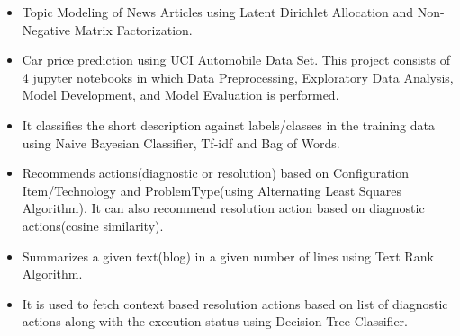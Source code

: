 
\let\orighref\href
\renewcommand{\hrefa}[2]{\orighref{#1}{#2\,\faExternalLink}}

\begin{itemize}
\item Topic Modeling of News Articles using Latent Dirichlet Allocation and Non-Negative Matrix Factorization.
\end{itemize}
\begin{itemize}
\item Car price prediction using \href{https://archive.ics.uci.edu/ml/datasets/Automobile}{UCI Automobile Data Set}. This project consists of 4 jupyter notebooks in which Data Preprocessing, Exploratory Data Analysis, Model Development, and Model Evaluation is performed.
\end{itemize}
\begin{itemize}
\item It classifies the short description against labels/classes in the training data using Naive Bayesian Classifier, Tf-idf and Bag of Words.
\end{itemize}
\begin{itemize}
\item Recommends actions(diagnostic or resolution) based on Configuration Item/Technology and ProblemType(using Alternating Least Squares Algorithm). It can also recommend resolution action based on diagnostic actions(cosine similarity).
\end{itemize}
\begin{itemize}
\item Summarizes a given text(blog) in a given number of lines using Text Rank Algorithm.
\end{itemize}
\begin{itemize}
\item 
It is used to fetch context based resolution actions based on list of diagnostic actions along with the execution status using Decision Tree Classifier.
\end{itemize}
